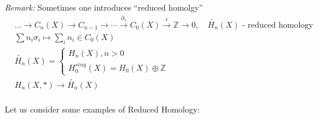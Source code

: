 \documentclass[11pt,a4paper]{report}
\begin{document}
                \emph{Remark:} Sometimes one introduces ``reduced homolgy''
                \begin{align*}
                  &\dots \rightarrow C_n(X) \rightarrow C_{n-1} \rightarrow \cdots \xrightarrow{\partial_1} C_0(X) \xrightarrow{\epsilon} \mathbb{Z} \rightarrow 0, \quad \tilde{H_n}(X) \textrm{ - reduced homology}\\
                  & \sum n_i\sigma_ i \mapsto \sum_in_i \in C_0(X)\\
                  &\tilde{H_n}(X) = \left\{\begin{array}{l}H_n(X), n > 0\\H_0^{sing}(X) = H_0(X)\oplus\mathbb{Z}\end{array} \right.\\
                  & H_n(X,\ast) \rightarrow \tilde{H_n}(X)\\
                \end{align*}

              Let us consider some examples of Reduced Homology: \\
\end{document}

